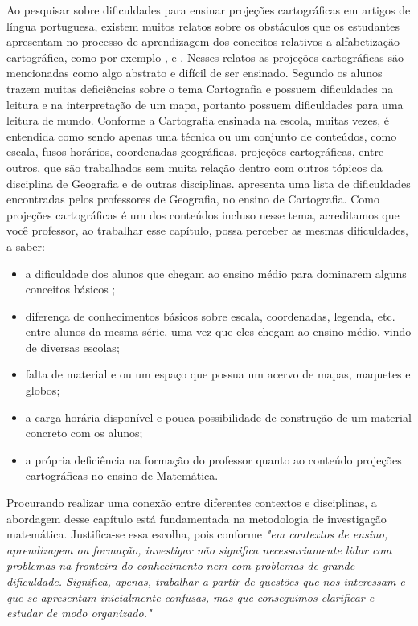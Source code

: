 \begin{apresentacao}
{Ao pesquisar sobre dificuldades para ensinar projeções cartográficas em artigos de língua portuguesa, existem muitos relatos sobre os obstáculos que os estudantes apresentam no processo de aprendizagem dos conceitos relativos a alfabetização cartográfica, como por exemplo \cite{Almeida}, \cite{Lunkes} e \cite{Ludwig}. Nesses relatos as projeções cartográficas são mencionadas como algo abstrato e difícil de ser ensinado. Segundo \cite{Lunkes} os alunos trazem muitas deficiências sobre o tema Cartografia e possuem dificuldades na leitura e na interpretação de um mapa, portanto possuem dificuldades para uma leitura de mundo. Conforme \cite{Ludwig} a Cartografia ensinada na escola,  muitas vezes, é entendida como sendo apenas uma técnica ou um conjunto de conteúdos, como escala, fusos horários, coordenadas geográficas, projeções cartográficas, entre outros, que são trabalhados sem muita relação dentro com outros tópicos da disciplina de Geografia e de outras disciplinas. \cite{Lunkes} apresenta uma lista de dificuldades encontradas pelos professores de Geografia, no ensino de Cartografia. Como projeções cartográficas é um dos conteúdos incluso nesse tema, acreditamos que você professor, ao trabalhar esse capítulo, possa perceber as mesmas dificuldades, a saber:

\begin{itemize}
\item a dificuldade dos alunos que chegam ao ensino médio para dominarem alguns conceitos básicos ;
\item  diferença de conhecimentos básicos sobre escala, coordenadas, legenda, etc. entre alunos da mesma série, uma vez que eles chegam ao ensino médio, vindo de diversas escolas;
\item  falta de material e ou um espaço que possua um acervo de mapas, maquetes e globos;

\item a carga horária disponível e pouca possibilidade de construção de um material concreto com os alunos; 

\item a própria deficiência na formação do professor quanto ao conteúdo projeções cartográficas no ensino de Matemática.
\end{itemize}



Procurando realizar uma conexão entre diferentes contextos e disciplinas, a abordagem desse capítulo está fundamentada na metodologia de investigação matemática. Justifica-se essa escolha, pois conforme \cite[p.2]{Ponte} \textit{"em contextos de ensino, aprendizagem ou formação, investigar não significa necessariamente lidar com problemas na fronteira do conhecimento nem com problemas de grande dificuldade. Significa, apenas, trabalhar a partir de questões que nos interessam e que se apresentam inicialmente confusas, mas que conseguimos clarificar e estudar de modo organizado." }

}
\end{apresentacao}
